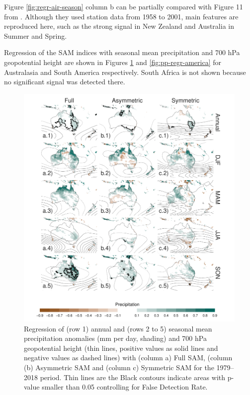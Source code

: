 \documentclass[]{ametsocV5}
\begin{document}
Figure \ref{fig:regr-air-season} column b can be partially compared with
Figure 11 from \citet{fogt2012}. Although they used station data from
1958 to 2001, main features are reproduced here, such as the strong
signal in New Zealand and Australia in Summer and Spring.

Regression of the SAM indices with seasonal mean precipitation and 700
hPa geopotential height are shown in Figures \ref{fig:pp-regr-oceania}
and \ref{fig:pp-regr-america} for Australasia and South America
respectively. South Africa is not shown because no significant signal
was detected there.

\begin{figure}
\includegraphics{pp-regr-oceania-1} \caption[Regression of (row 1) annual and (rows 2 to 5) seasonal mean precipitation anomalies (mm per day, shading) and 700 hPa geopotential height (thin lines, positive values as solid lines and negative values as dashed lines) with (column a) Full SAM, (column (b) Asymmetric SAM and (column c) Symmetric SAM for the 1979–2018 period]{Regression of (row 1) annual and (rows 2 to 5) seasonal mean precipitation anomalies (mm per day, shading) and 700 hPa geopotential height (thin lines, positive values as solid lines and negative values as dashed lines) with (column a) Full SAM, (column (b) Asymmetric SAM and (column c) Symmetric SAM for the 1979–2018 period. Thin lines are the Black contours indicate areas with p-value smaller than 0.05 controlling for False Detection Rate.}\label{fig:pp-regr-oceania}
\end{figure}
\end{document}
